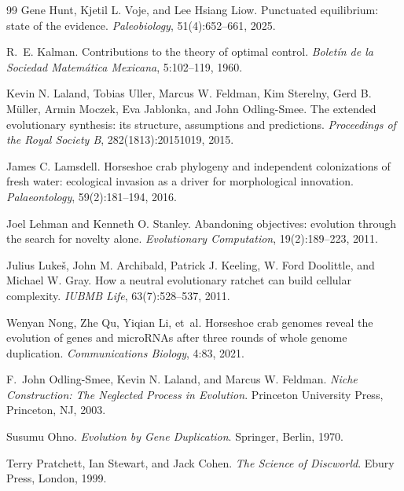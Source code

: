 \documentclass[11pt,a4paper]{article}
\theoremstyle{remark}
\begin{document}
\begin{thebibliography}{99}
Gene Hunt, Kjetil L. Voje, and Lee Hsiang Liow.
\newblock Punctuated equilibrium: state of the evidence.
\newblock \emph{Paleobiology}, 51(4):652--661, 2025.

R.~E. Kalman.
\newblock Contributions to the theory of optimal control.
\newblock \emph{Bolet\'in de la Sociedad Matem\'atica Mexicana}, 5:102--119, 1960.

Kevin N. Laland, Tobias Uller, Marcus W. Feldman, Kim Sterelny, Gerd B. M\"uller, Armin Moczek, Eva Jablonka, and John Odling-Smee.
\newblock The extended evolutionary synthesis: its structure, assumptions and predictions.
\newblock \emph{Proceedings of the Royal Society B}, 282(1813):20151019, 2015.

James C. Lamsdell.
\newblock Horseshoe crab phylogeny and independent colonizations of fresh water: ecological invasion as a driver for morphological innovation.
\newblock \emph{Palaeontology}, 59(2):181--194, 2016.

Joel Lehman and Kenneth O. Stanley.
\newblock Abandoning objectives: evolution through the search for novelty alone.
\newblock \emph{Evolutionary Computation}, 19(2):189--223, 2011.

Julius Luke\v{s}, John M. Archibald, Patrick J. Keeling, W. Ford Doolittle, and Michael W. Gray.
\newblock How a neutral evolutionary ratchet can build cellular complexity.
\newblock \emph{IUBMB Life}, 63(7):528--537, 2011.

Wenyan Nong, Zhe Qu, Yiqian Li, et~al.
\newblock Horseshoe crab genomes reveal the evolution of genes and microRNAs after three rounds of whole genome duplication.
\newblock \emph{Communications Biology}, 4:83, 2021.

F.~John Odling-Smee, Kevin N. Laland, and Marcus W. Feldman.
\newblock \emph{Niche Construction: The Neglected Process in Evolution}.
\newblock Princeton University Press, Princeton, NJ, 2003.

Susumu Ohno.
\newblock \emph{Evolution by Gene Duplication}.
\newblock Springer, Berlin, 1970.

Terry Pratchett, Ian Stewart, and Jack Cohen.
\newblock \emph{The Science of Discworld}.
\newblock Ebury Press, London, 1999.


\end{thebibliography}
\end{document}
